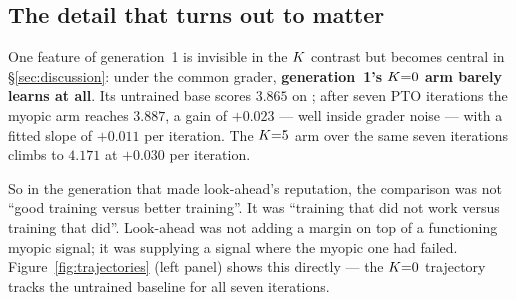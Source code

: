 \subsection{The detail that turns out to matter}
One feature of generation~1 is invisible in the $K$ contrast but becomes central in
\S\ref{sec:discussion}: under the common grader, \textbf{generation~1's $K{=}0$ arm barely
learns at all}. Its untrained base scores $3.865$ on \QQ{}; after seven PTO iterations the
myopic arm reaches $3.887$, a gain of $+0.023$ --- well inside grader noise --- with a fitted
slope of $+0.011$ per iteration. The $K{=}5$ arm over the same seven iterations climbs to
$4.171$ at $+0.030$ per iteration.

So in the generation that made look-ahead's reputation, the comparison was not
``good training versus better training''. It was ``training that did not work versus training
that did''. Look-ahead was not adding a margin on top of a functioning myopic signal; it was
supplying a signal where the myopic one had failed. Figure~\ref{fig:trajectories} (left panel)
shows this directly --- the $K{=}0$ trajectory tracks the untrained baseline for all seven
iterations.

